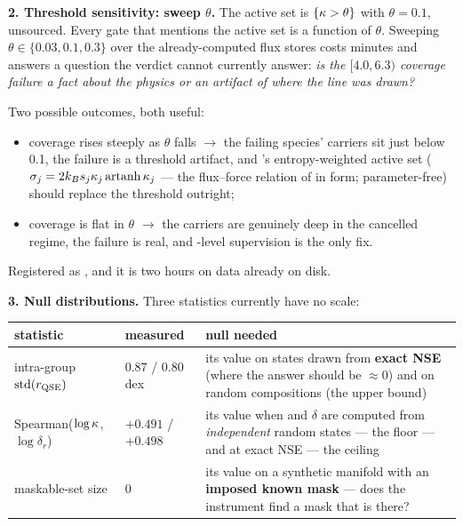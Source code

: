\textbf{2. Threshold sensitivity: sweep $\theta$.} The active set is
$\{\kappa > \theta\}$ with $\theta = 0.1$, unsourced. Every gate that mentions
the active set is a function of $\theta$. Sweeping $\theta \in \{0.03, 0.1,
0.3\}$ over the already-computed flux stores costs minutes and answers a
question the verdict cannot currently answer: \emph{is the $[4.0, 6.3)$
coverage failure a fact about the physics or an artifact of where the line was
drawn?}

Two possible outcomes, both useful:

\begin{itemize}
\item coverage rises steeply as $\theta$ falls $\to$ the failing species'
  carriers sit just below 0.1, the failure is a threshold artifact, and
  's entropy-weighted active set
  ($\sigma_j = 2k_{B} s_j \kappa_j \operatorname{artanh}\kappa_j$ --- the flux--force relation of
  \citealt{beard2007} in \kap{} form; parameter-free) should replace the
  threshold outright;
\item coverage is flat in $\theta$ $\to$ the carriers are genuinely deep in
  the cancelled regime, the failure is real, and \Phifl-level supervision is
  the only fix.
\end{itemize}

Registered as , and it is two hours on data already on disk.

\textbf{3. Null distributions.} Three statistics currently have no scale:

\begingroup\small
\begin{tabularx}{\textwidth}{@{}L{3.4cm} L{2.6cm} Y@{}}
\toprule
\textbf{statistic} & \textbf{measured} & \textbf{null needed} \\
\midrule
intra-group $\mathrm{std}(r_{\mathrm{QSE}})$ & 0.87 / 0.80 dex & its value on states
  drawn from \textbf{exact NSE} (where the answer should be $\approx 0$) and on
  random compositions (the upper bound) \\
Spearman($\log\kappa$, $\log\delta_r$) & $+0.491$ / $+0.498$ & its value when
  \kap{} and $\delta$ are computed from \emph{independent} random states ---
  the floor --- and at exact NSE --- the ceiling \\
maskable-set size & 0 & its value on a synthetic manifold with an
  \textbf{imposed known mask} --- does the instrument find a mask that is
  there? \\
\bottomrule
\end{tabularx}
\endgroup

